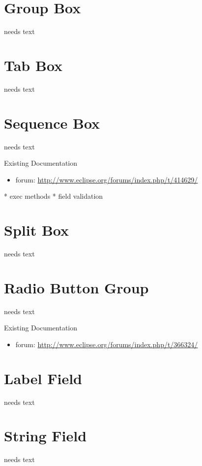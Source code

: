 \documentclass[a4paper,10pt,twoside]{book}
\begin{document}
\section{Group Box}
needs text

\section{Tab Box}
needs text

\section{Sequence Box}
needs text

\noindent Existing Documentation
\begin{itemize}
  \item forum: \url{http://www.eclipse.org/forums/index.php/t/414629/}
\end{itemize}

* exec methods
* field validation


\section{Split Box}
needs text

\section{Radio Button Group}
needs text

\noindent Existing Documentation
\begin{itemize}
  \item forum: \url{http://www.eclipse.org/forums/index.php/t/366324/}
\end{itemize}

\section{Label Field}
needs text
	
\section{String Field}
needs text
\end{document}
